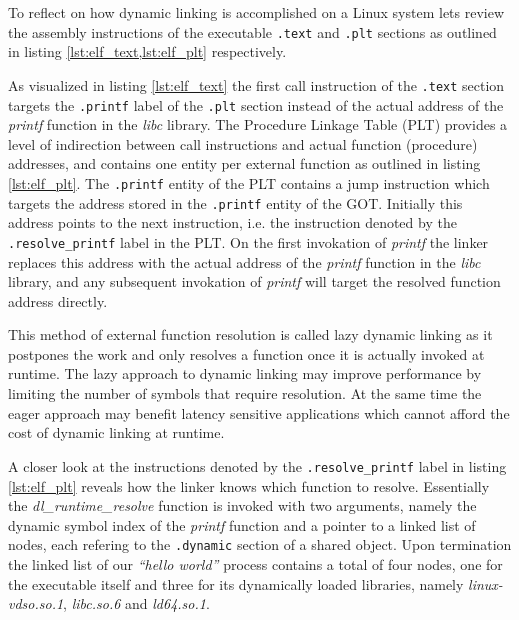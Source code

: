 To reflect on how dynamic linking is accomplished on a Linux system lets review the assembly instructions of the executable \texttt{.text} and \texttt{.plt} sections as outlined in listing \ref{lst:elf_text,lst:elf_plt} respectively.





As visualized in listing \ref{lst:elf_text} the first call instruction of the \texttt{.text} section targets the \texttt{.printf} label of the \texttt{.plt} section instead of the actual address of the \textit{printf} function in the \textit{libc} library. The Procedure Linkage Table (PLT) provides a level of indirection between call instructions and actual function (procedure) addresses, and contains one entity per external function as outlined in listing \ref{lst:elf_plt}. The \texttt{.printf} entity of the PLT contains a jump instruction which targets the address stored in the \texttt{.printf} entity of the GOT. Initially this address points to the next instruction, i.e. the instruction denoted by the \texttt{.resolve\_printf} label in the PLT. On the first invokation of \textit{printf} the linker replaces this address with the actual address of the \textit{printf} function in the \textit{libc} library, and any subsequent invokation of \textit{printf} will target the resolved function address directly.

This method of external function resolution is called lazy dynamic linking as it postpones the work and only resolves a function once it is actually invoked at runtime. The lazy approach to dynamic linking may improve performance by limiting the number of symbols that require resolution. At the same time the eager approach may benefit latency sensitive applications which cannot afford the cost of dynamic linking at runtime.

A closer look at the instructions denoted by the \texttt{.resolve\_printf} label in listing \ref{lst:elf_plt} reveals how the linker knows which function to resolve. Essentially the \textit{dl\_runtime\_resolve} function is invoked with two arguments, namely the dynamic symbol index of the \textit{printf} function and a pointer to a linked list of nodes, each refering to the \texttt{.dynamic} section of a shared object. Upon termination the linked list of our \textit{``hello world''} process contains a total of four nodes, one for the executable itself and three for its dynamically loaded libraries, namely \textit{linux-vdso.so.1}, \textit{libc.so.6} and \textit{ld64.so.1}.

